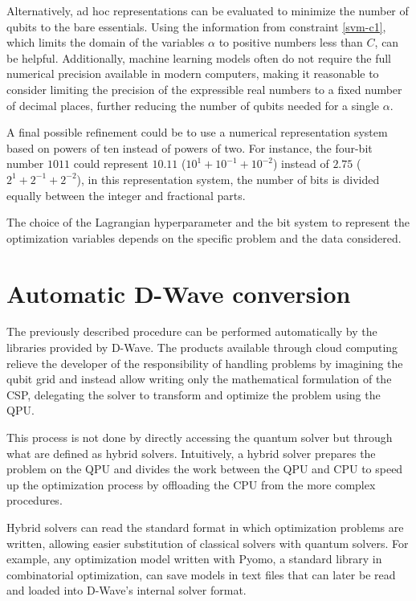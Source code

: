Alternatively, ad hoc representations can be evaluated to minimize the number of qubits to the bare essentials. Using the information from constraint \ref{svm-c1}, which limits the domain of the variables $\alpha$ to positive numbers less than $C$, can be helpful. Additionally, machine learning models often do not require the full numerical precision available in modern computers, making it reasonable to consider limiting the precision of the expressible real numbers to a fixed number of decimal places, further reducing the number of qubits needed for a single $\alpha$.

A final possible refinement could be to use a numerical representation system based on powers of ten instead of powers of two. For instance, the four-bit number $1011$ could represent $10.11$ ($10^1 + 10^{-1} + 10^{-2}$) instead of $2.75$ ($2^1 + 2^{-1} + 2^{-2}$), in this representation system, the number of bits is divided equally between the integer and fractional parts.

The choice of the Lagrangian hyperparameter and the bit system to represent the optimization variables depends on the specific problem and the data considered.

\section{Automatic D-Wave conversion}

The previously described procedure can be performed automatically by the libraries provided by D-Wave. The products available through cloud computing relieve the developer of the responsibility of handling problems by imagining the qubit grid and instead allow writing only the mathematical formulation of the CSP, delegating the solver to transform and optimize the problem using the QPU.

This process is not done by directly accessing the quantum solver but through what are defined as hybrid solvers\cite{hybrid}. Intuitively, a hybrid solver prepares the problem on the QPU and divides the work between the QPU and CPU to speed up the optimization process by offloading the CPU from the more complex procedures.

Hybrid solvers can read the standard format in which optimization problems are written, allowing easier substitution of classical solvers with quantum solvers. For example, any optimization model written with Pyomo\cite{pyomo}, a standard library in combinatorial optimization, can save models in text files that can later be read and loaded into D-Wave’s internal solver format.

